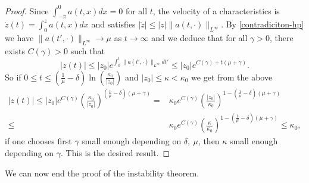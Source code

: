 \documentclass[12pt]{amsart}
\numberwithin{equation}{section}
\numberwithin{equation}{section}
\begin{document}
\begin{proof}

Since $\int_{-\pi}^0 a(t,x)dx=0$ for all $t$, the velocity of a characteristics is $\dot z(t)=\int_0^z a(t,x)dx$ and satisfies $|\dot z|\leq |z|\| a(t,\cdot)\|_{L^\infty}$. By \eqref{contradiciton-hp} we have $ \| a(t',\cdot)\|_{L^\infty}\to \mu$ as $t\to \infty$ and we deduce that for all $\gamma>0$, there exists $C(\gamma)>0$ such that
$$
|z(t)|\leq |z_0|e^{\int_0^t \| a(t',\cdot)\|_{L^\infty}dt'}\leq |z_0|e^{C(\gamma)+t(\mu+\gamma)}.
$$
So if $0\leq t \leq  \left(\frac{1}{\mu}-\delta\right)\ln \left(\frac{\kappa_0}{|z_0|} \right)$ and $|z_0|\leq \kappa<\kappa_0$ we get from the above
\begin{align*}
|z(t)|\leq |z_0|e^{C(\gamma)}  \left(\frac{\kappa_0}{|z_0|} \right)^{(\frac{1}{\mu}-\delta)(\mu+\gamma)}=& \kappa_0 e^{C(\gamma)} \left(\frac{|z_0|}{\kappa_0}\right)^{1-(\frac{1}{\mu}-\delta)(\mu+\gamma)}\\
\leq&\kappa_0 e^{C(\gamma)} \left(\frac{\kappa}{\kappa_0}\right)^{1-(\frac{1}{\mu}-\delta)(\mu+\gamma)}
\leq \kappa_0,
\end{align*}
if one chooses first $\gamma$ small enough depending on $\delta,~\mu$, then $\kappa$ small enough depending on $\gamma$. This is the desired result.
\end{proof}
 
 
We can now end the proof of the instability theorem.
 
\end{document}
